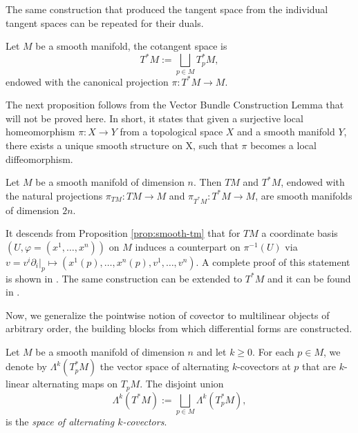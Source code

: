 \noindent The same construction that produced the tangent space from the individual tangent spaces can be repeated for their duals.

\begin{definition}\label{def:cot-space}
	Let $M$ be a smooth manifold, the cotangent space is
	\[
	T^*M := \bigsqcup_{p \in M} T_p^*M,
	\]
	endowed with the canonical projection $\pi: T^*M \to M$.
\end{definition}

The next proposition follows from the Vector Bundle Construction Lemma \cite[Lemma 10.6]{leeIntroductionSmoothManifolds2013} that will not be proved here. In short, it states that given a surjective local homeomorphism $\pi : X \to Y$ from a topological space $X$ and a smooth manifold $Y$, there exists a unique smooth structure on X, such that $\pi$ becomes a local diffeomorphism. 

\begin{proposition}\label{prop:smooth-tm}
	Let $M$ be a smooth manifold of dimension $n$. Then $TM$ and $T^*M$, endowed
	with the natural projections $\pi_{TM} : TM \to M$ and $\pi_{T^*M} : T^*M \to M$,
	are smooth manifolds of dimension $2n$.
\end{proposition}

It descends from Proposition \ref{prop:smooth-tm} that for $TM$ a coordinate basis $(U,\varphi=(x^1,\dots,x^n))$ on $M$ induces a counterpart on $\pi^{-1}(U)$ via $v = v^i \partial_i|_p \mapsto (x^1(p),\dots,x^n(p),v^1,\dots,v^n)$. A complete proof of this statement is shown in \cite[Proposition 3.18]{leeIntroductionSmoothManifolds2013}. The same construction can be extended to $T^*M$ and it can be found in \cite[Proposition 11.9]{leeIntroductionSmoothManifolds2013}.

\noindent Now, we generalize the pointwise notion of covector to multilinear objects of arbitrary order, the building blocks from which differential forms are constructed.

\begin{definition}\label{def:k-covector}
	Let $M$ be a smooth manifold of dimension $n$ and let $k \geq 0$. For each $p \in M$, we denote by $\Lambda^k(T_p^*M)$ the vector space of alternating $k$-covectors at $p$ that are $k$-linear alternating maps on $T_pM$. The disjoint union
	\[
	\Lambda^k(T^*M) := \bigsqcup_{p \in M} \Lambda^k(T_p^*M),
	\]
	is the \emph{space of alternating $k$-covectors}.
\end{definition}

